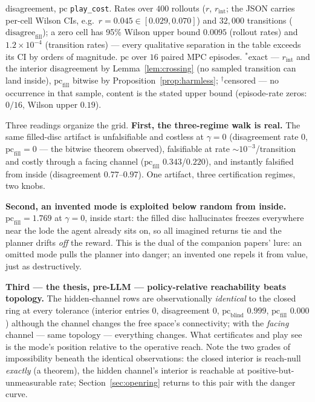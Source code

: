 \documentclass[11pt]{article}
\theoremstyle{remark}
\begin{document}
\begin{table}[h]
{disagreement, $\mathrm{pc}$ \texttt{play\_cost}.
Rates over $400$ rollouts ($r$, $r_{\mathrm{int}}$; the JSON
carries per-cell Wilson CIs, e.g.\ $r = 0.045 \in [0.029, 0.070]$) and
$32{,}000$ transitions ($\mathrm{disagree}_{\mathrm{fill}}$); a zero cell
has 95\% Wilson upper bound $0.0095$ (rollout rates) and $1.2 \times
10^{-4}$ (transition rates) --- every qualitative separation in the table
exceeds its CI by orders of magnitude. $\mathrm{pc}$ over $16$ paired MPC
episodes. $^{\ast}$exact --- $r_{\mathrm{int}}$ and the interior
disagreement by Lemma~\ref{lem:crossing} (no sampled transition can land
inside), $\mathrm{pc}_{\mathrm{fill}}$ bitwise by
Proposition~\ref{prop:harmless}; $^{\dagger}$censored --- no occurrence
in that sample, content is the stated upper bound (episode-rate zeros:
$0/16$, Wilson upper $0.19$).}
\label{tab:mechanism}
\end{table}

Three readings organize the grid. \textbf{First, the three-regime walk is
real.} The same filled-disc artifact is unfalsifiable and costless at
$\gamma = 0$ (disagreement rate $0$, $\mathrm{pc}_{\mathrm{fill}} = 0$
--- the bitwise theorem observed), falsifiable at rate
${\sim}10^{-3}$/transition and costly through a facing channel
($\mathrm{pc}_{\mathrm{fill}}$ $0.343$/$0.220$), and instantly falsified
from inside (disagreement $0.77$--$0.97$). One artifact, three
certification regimes, two knobs.

\textbf{Second, an invented mode is exploited below random from inside.}
$\mathrm{pc}_{\mathrm{fill}} = 1.769$ at $\gamma = 0$, inside start: the
filled disc hallucinates freezes everywhere near the lode the agent already
sits on, so all imagined returns tie and the planner drifts \emph{off} the
reward. This is the dual of the companion papers' lure: an omitted mode
pulls the planner into danger; an invented one repels it from value, just
as destructively.

\textbf{Third --- the thesis, pre-LLM --- policy-relative reachability
beats topology.} The hidden-channel rows are observationally
\emph{identical} to the closed ring at every tolerance (interior entries
$0$, disagreement $0$, $\mathrm{pc}_{\mathrm{blind}}$ $0.999$,
$\mathrm{pc}_{\mathrm{fill}}$ $0.000$) although the channel changes the
free space's connectivity; with the \emph{facing} channel --- same
topology --- everything changes. What certificates and play see is the
mode's position relative to the operative reach. Note the two grades of
impossibility beneath the identical observations: the closed interior is
reach-null \emph{exactly} (a theorem), the hidden channel's interior is
reachable at positive-but-unmeasurable rate; Section~\ref{sec:openring}
returns to this pair with the danger curve.
\end{document}
